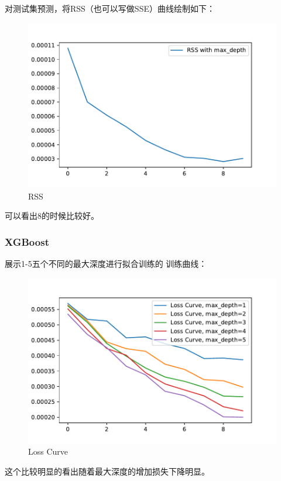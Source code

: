 \documentclass[UTF8,a4paper,AutoFakeBold,AutoFakeSlant]{article}
\begin{document}
对测试集预测，将RSS（也可以写做SSE）曲线绘制如下：
\begin{figure}[H]
  \centering
  \includegraphics[scale=0.675]{rss.pdf}
  \caption{RSS}
  \label{f2}
\end{figure}

可以看出8的时候比较好。


\subsubsection{XGBoost}
展示1-5五个不同的最大深度进行拟合训练的
训练曲线：
\begin{figure}[H]
  \centering
  \includegraphics[scale=0.675]{boosting_treeloss.pdf}
  \caption{Loss Curve}
  \label{f3}
\end{figure}
这个比较明显的看出随着最大深度的增加损失下降明显。
\end{document}
